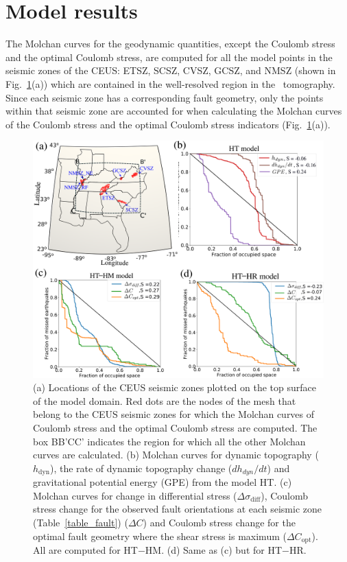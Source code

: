 \documentclass[draft,linenumbers]{agujournal2018}
\begin{document}
\section{Model results}
The Molchan curves for the geodynamic quantities, except the Coulomb stress and the optimal Coulomb stress, are computed for all the model points in the seismic zones of the CEUS: ETSZ, SCSZ, CVSZ, GCSZ, and NMSZ (shown in Fig.~\ref{model_results}(a)) which are contained in the well-resolved region in the~\citet{Biryol_2016} tomography. Since each seismic zone has a corresponding fault geometry, only the points within that seismic zone are accounted for when calculating the Molchan curves of the Coulomb stress and the optimal Coulomb stress indicators (Fig.~\ref{model_results}(a)). 
%
\begin{figure}[h!]
\centering
	\includegraphics[width=\linewidth]{figures/results_combined.png}
	\caption{(a) Locations of the CEUS seismic zones plotted on the top surface of the model domain. Red dots are the nodes of the mesh that belong to the CEUS seismic zones for which the Molchan curves of Coulomb stress and the optimal Coulomb stress are computed. The box BB'CC' indicates the region for which all the other Molchan curves are calculated. 
(b) Molchan curves for dynamic topography ($h_{\text{dyn}}$), the rate of dynamic topography change ($dh_{dyn}/dt$) and gravitational potential energy (GPE) from the model HT. (c) Molchan curves for change in differential stress ($\Delta \sigma_{\text{diff}}$), Coulomb stress change for the observed fault orientations at each seismic zone (Table~\ref{table_fault}) ($\Delta C$) and Coulomb stress change for the optimal fault geometry where the shear stress is maximum ($\Delta C_{\text{opt}}$). All are computed for HT$-$HM. (d) Same as (c) but for HT$-$HR.}
	\label{model_results}
\end{figure}
\end{document}
